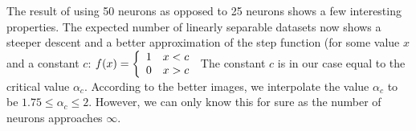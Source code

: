 The result of using 50 neurons as opposed to 25 neurons shows a few interesting properties. The expected number of linearly separable datasets now shows a steeper descent and a better approximation of the step function (for some value $x$ and a constant $c$: 
$f(x) = \left\{ 
  \begin{array}{l l}
    1 & x < c\\
    0 & x > c
  \end{array} \right.$
The constant $c$ is in our case equal to the critical value $\alpha_c$. According to the better images, we interpolate the value $\alpha_c$ to be $1.75 \leq \alpha_c \leq 2$. However, we can only know this for sure as the number of neurons approaches $\infty$.
